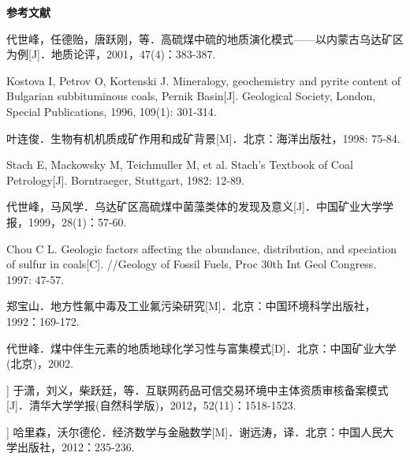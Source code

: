 \clearpage
{}
{}
\begingroup
    \centering
    \heiti\bfseries 参考文献
    \par
    \vspace{\baselineskip}
\endgroup

\begin{enumerate}[label={[\arabic*]}, leftmargin=2em, itemsep=0pt, parsep=0pt]
    \songti
    \item 代世峰，任德贻，唐跃刚，等．高硫煤中硫的地质演化模式——以内蒙古乌达矿区为例[J]．地质论评，2001，47(4)：383-387.
    \item Kostova I, Petrov O, Kortenski J. Mineralogy, geochemistry and pyrite content of Bulgarian subbituminous coals, Pernik Basin[J]. Geological Society, London, Special Publications, 1996, 109(1): 301-314.
    \item 叶连俊．生物有机机质成矿作用和成矿背景[M]．北京：海洋出版社，1998: 75-84.
    \item Stach E, Mackowsky M, Teichmuller M, et al. Stach's Textbook of Coal Petrology[J]. Borntraeger, Stuttgart, 1982: 12-89.
    \item 代世峰，马风学．乌达矿区高硫煤中菌藻类体的发现及意义[J]．中国矿业大学学报，1999，28(1)：57-60.
    \item Chou C L. Geologic factors affecting the abundance, distribution, and speciation of sulfur in coals[C]. //Geology of Fossil Fuels, Proc 30th Int Geol Congress. 1997: 47-57.
    \item 郑宝山．地方性氟中毒及工业氟污染研究[M]．北京：中国环境科学出版社，1992：169-172.
    \item 代世峰．煤中伴生元素的地质地球化学习性与富集模式[D]．北京：中国矿业大学(北京)，2002.
    
    \item[\dots\dots]
    
    \item[ [23] ] 于潇，刘义，柴跃廷，等．互联网药品可信交易环境中主体资质审核备案模式[J]．清华大学学报(自然科学版)，2012，52(11)：1518-1523.
    
    \item[\dots\dots]
    
    \item[ [220] ] 哈里森，沃尔德伦．经济数学与金融数学[M]．谢远涛，译．北京：中国人民大学出版社，2012：235-236.
\end{enumerate}

\clearpage
\mbox{}\clearpage 
